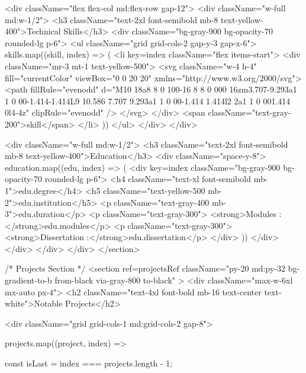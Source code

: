 {          <div className="flex flex-col md:flex-row gap-12">
            <div className="w-full md:w-1/2">
              <h3 className="text-2xl font-semibold mb-8 text-yellow-400">Technical Skills</h3>
              <div className="bg-gray-900 bg-opacity-70 rounded-lg p-6">
                <ul className="grid grid-cols-2 gap-y-3 gap-x-6">
                  {skills.map((skill, index) => (
                    <li key={index} className="flex items-start">
                      <div className="mr-3 mt-1 text-yellow-500">
                        <svg className="w-4 h-4" fill="currentColor" viewBox="0 0 20 20" xmlns="http://www.w3.org/2000/svg">
                          <path fillRule="evenodd" d="M10 18a8 8 0 100-16 8 8 0 000 16zm3.707-9.293a1 1 0 00-1.414-1.414L9 10.586 7.707 9.293a1 1 0 00-1.414 1.414l2 2a1 1 0 001.414 0l4-4z" clipRule="evenodd" />
                        </svg>
                      </div>
                      <span className="text-gray-200">{skill}</span>
                    </li>
                  ))}
                </ul>
              </div>
            </div>
            
            <div className="w-full md:w-1/2">
              <h3 className="text-2xl font-semibold mb-8 text-yellow-400">Education</h3>
              <div className="space-y-8">
                {education.map((edu, index) => (
                  <div key={index} className="bg-gray-900 bg-opacity-70 rounded-lg p-6">
                    <h4 className="text-xl font-semibold mb-1">{edu.degree}</h4>
                    <h5 className="text-yellow-500 mb-2">{edu.institution}</h5>
                    <p className="text-gray-400 mb-3">{edu.duration}</p>
                    <p className="text-gray-300"> <strong>Modules :</strong>{edu.modules}</p>
                    <p className="text-gray-300"><strong>Dissertation :</strong>{edu.dissertation}</p>
                  </div>
                ))}
              </div>
            </div>
          </div>
        </div>
      </section>

      {/* Projects Section */}
      <section
        ref={projectsRef}
        className="py-20 md:py-32 bg-gradient-to-b from-black via-gray-800 to-black"
      >
        <div className="max-w-6xl mx-auto px-4">
          <h2 className="text-4xl font-bold mb-16 text-center text-white">Notable Projects</h2>
          
          <div className="grid grid-cols-1 md:grid-cols-2 gap-8">
          {projects.map((project, index) => {
            const isLast = index === projects.length - 1;

}}}
